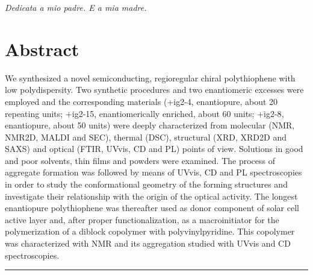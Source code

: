 \documentclass[a4paper,12pt,openright]{book}
\begin{document}
\cleardoublepage \vspace*{12cm}
\begin{flushright}
\large {\it Dedicata a mio padre. E a mia madre.}
\end{flushright}


\chapter[Abstract]{\centering Abstract}
We synthesized a novel semiconducting, regioregular chiral polythiophene with low polydispersity. 
Two synthetic procedures and two enantiomeric excesses were employed and the corresponding materials (\cmpd+{ig2-4}, enantiopure, about 20 repeating units; \cmpd+{ig2-15}, enantiomerically enriched, about 60 units; \cmpd+{ig2-8}, enantiopure, about 50 units) were deeply characterized from molecular (\acrshort{NMR}, \acrshort{NMR2D}, \acrshort{MALDI} and \acrshort{SEC}), thermal (\acrshort{DSC}), structural (\acrshort{XRD}, \acrshort{XRD2D} and \acrshort{SAXS}) and optical (\acrshort{FTIR}, \acrshort{UVvis}, \acrshort{CD} and \acrshort{PL}) points of view. 
Solutions in good and poor solvents, thin films and powders were examined. 
The process of aggregate formation was followed by means of \acrshort{UVvis}, \acrfull{CD} and \acrfull{PL} spectroscopies in order to study the conformational geometry of the forming structures and investigate their relationship with the origin of the optical activity. The longest enantiopure poly\-thio\-phene was thereafter used as donor component of solar cell active layer and, after proper functionalization, as a macro\-initiator for the polymerization of a diblock copolymer with poly\-vinyl\-pyridine. This copolymer was characterized with \acrshort{NMR} and its aggregation studied with \acrshort{UVvis} and \acrshort{CD} spectroscopies.

{
\vfill
\centering \rule{5cm}{1pt}\\
\vfill
}
\end{document}
